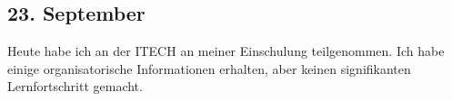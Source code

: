 \subsection{23. September}
Heute habe ich an der ITECH an meiner Einschulung teilgenommen. Ich habe einige organisatorische Informationen erhalten, aber keinen signifikanten Lernfortschritt gemacht.